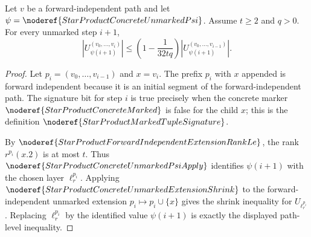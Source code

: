 \begin{lemma}
Let \(v\) be a forward-independent path and let
\(\psi=\noderef{StarProductConcreteUnmarkedPsi}\).  Assume \(t\ge2\) and
\(q>0\).  For every unmarked step
\(i+1\),
\[
  |U_{\psi(i+1)}^{(v_0,\ldots,v_i)}|
  \le
  \left(1-\frac{1}{32tq}\right)
  |U_{\psi(i+1)}^{(v_0,\ldots,v_{i-1})}|.
\]
\end{lemma}
\begin{proof}
Let \(p_i=(v_0,\ldots,v_{i-1})\) and \(x=v_i\).  The prefix \(p_i\) with
\(x\) appended is forward independent because it is an initial segment of the
forward-independent path.  The signature bit for step \(i\) is true precisely
when the concrete marker \(\noderef{StarProductConcreteMarked}\) is false for
the child \(x\); this is the definition
\(\noderef{StarProductMarkedTupleSignature}\).

By \(\noderef{StarProductForwardIndependentExtensionRankLe}\), the rank
\(r^{p_i}(x.2)\) is at most \(t\).  Thus
\(\noderef{StarProductConcreteUnmarkedPsiApply}\) identifies
\(\psi(i+1)\) with the chosen layer \(\ell_r^{p_i}\).  Applying
\(\noderef{StarProductConcreteUnmarkedExtensionShrink}\) to the
forward-independent unmarked extension \(p_i\mapsto p_i\cup\{x\}\) gives the
shrink inequality for \(U_{\ell_r^{p_i}}\).  Replacing
\(\ell_r^{p_i}\) by the identified value \(\psi(i+1)\) is exactly the displayed
path-level inequality.
\end{proof}
